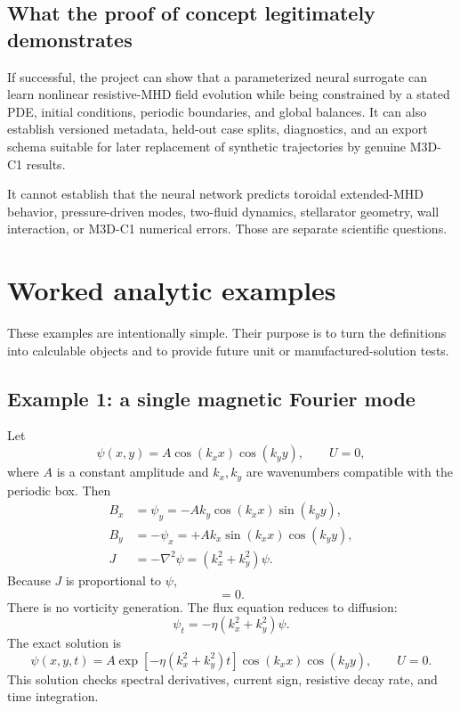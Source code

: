 \documentclass[11pt]{article}
\begin{document}
\subsection{What the proof of concept legitimately demonstrates}

If successful, the project can show that a parameterized neural surrogate can learn nonlinear resistive-MHD field evolution while being constrained by a stated PDE, initial conditions, periodic boundaries, and global balances. It can also establish versioned metadata, held-out case splits, diagnostics, and an export schema suitable for later replacement of synthetic trajectories by genuine M3D-C1 results.

It cannot establish that the neural network predicts toroidal extended-MHD behavior, pressure-driven modes, two-fluid dynamics, stellarator geometry, wall interaction, or M3D-C1 numerical errors. Those are separate scientific questions.

\section{Worked analytic examples}
\label{sec:examples}

These examples are intentionally simple. Their purpose is to turn the definitions into calculable objects and to provide future unit or manufactured-solution tests.

\subsection{Example 1: a single magnetic Fourier mode}

Let
\begin{equation}
\psi(x,y)=A\cos(k_xx)\cos(k_yy),
\qquad U=0,
\label{eq:singlepsimode}
\end{equation}
where $A$ is a constant amplitude and $k_x,k_y$ are wavenumbers compatible with the periodic box. Then
\begin{align}
B_x&=\psi_y=-A k_y\cos(k_xx)\sin(k_yy),\\
B_y&=-\psi_x=+A k_x\sin(k_xx)\cos(k_yy),\\
J&=-\nabla^2\psi=(k_x^2+k_y^2)\psi.
\end{align}
Because $J$ is proportional to $\psi$,
\begin{equation}
[J,\psi]=0.
\end{equation}
There is no vorticity generation. The flux equation reduces to diffusion:
\begin{equation}
\psi_t=-\eta(k_x^2+k_y^2)\psi.
\end{equation}
The exact solution is
\begin{equation}
\boxed{
\psi(x,y,t)=A\exp[-\eta(k_x^2+k_y^2)t]
\cos(k_xx)\cos(k_yy),
\qquad U=0.}
\label{eq:psidecaysolution}
\end{equation}
This solution checks spectral derivatives, current sign, resistive decay rate, and time integration.
\end{document}
